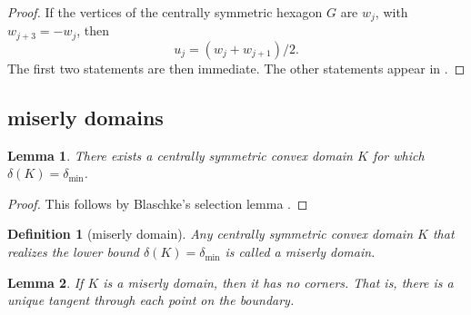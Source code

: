 \documentclass[11pt]{amsart}
\newtheorem{definition}{Definition}
\newtheorem{lemma}{Lemma}
\def\deltalat{\mathbb\delta}  %
\def\delt{\delta_{\min}}
\begin{document}
\begin{proof} If the vertices of the centrally symmetric hexagon 
$G$ are $w_j$, with $w_{j+3} = - w_j$,  then
$$u_j = (w_j+w_{j+1})/2.$$
The first two statements are then immediate.  The other statements appear in 
\cite[p.219,p.222]{R}.
\end{proof}


\subsection{miserly domains}

\begin{lemma}  There exists a centrally symmetric convex domain
$K$ for which $\deltalat(K) = \delt$.
\end{lemma}

\begin{proof} This follows by Blaschke's selection lemma \cite[p.220]{R}.
\end{proof}
%
\begin{definition}[miserly domain]
Any centrally symmetric convex domain $K$ that realizes the lower
bound $\deltalat(K) = \delt$ is called a {\it miserly domain}. %
\end{definition}

\begin{lemma}  If $K$ is a miserly domain, then it has no
corners.  That is, there is a unique tangent through each point
on the boundary.  \cite[p.221]{R}
\end{lemma}
\end{document}
